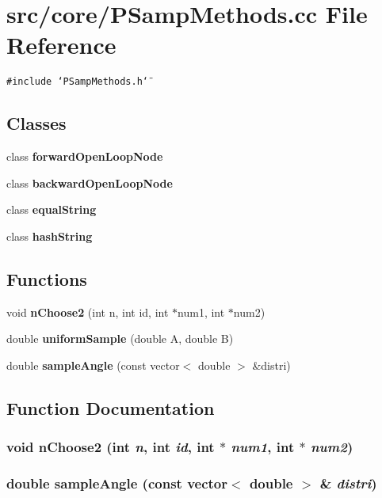 \section{src/core/PSamp\-Methods.cc File Reference}
\label{PSampMethods_8cc}


{\tt \#include \char`\"{}PSamp\-Methods.h\char`\"{}}\par
\subsection*{Classes}
\begin{CompactItemize}
\item 
class {\bf forward\-Open\-Loop\-Node}
\item 
class {\bf backward\-Open\-Loop\-Node}
\item 
class {\bf equal\-String}
\item 
class {\bf hash\-String}
\end{CompactItemize}
\subsection*{Functions}
\begin{CompactItemize}
\item 
void {\bf n\-Choose2} (int n, int id, int $\ast$num1, int $\ast$num2)
\item 
double {\bf uniform\-Sample} (double A, double B)
\item 
double {\bf sample\-Angle} (const vector$<$ double $>$ \&distri)
\end{CompactItemize}


\subsection{Function Documentation}
\subsubsection{\setlength{\rightskip}{0pt plus 5cm}void n\-Choose2 (int {\em n}, int {\em id}, int $\ast$ {\em num1}, int $\ast$ {\em num2})}\label{PSampMethods_8cc_b40dea05e3a521599c8eb6b035d25aec}


\subsubsection{\setlength{\rightskip}{0pt plus 5cm}double sample\-Angle (const vector$<$ double $>$ \& {\em distri})}\label{PSampMethods_8cc_d05f42b8f6586dc4e7b039b787b89d51}


